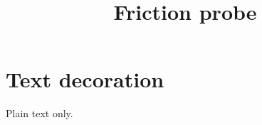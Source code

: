\documentclass{article}
\title{Friction probe}
\begin{document}
\section{Text decoration}
Plain text only.
\end{document}
